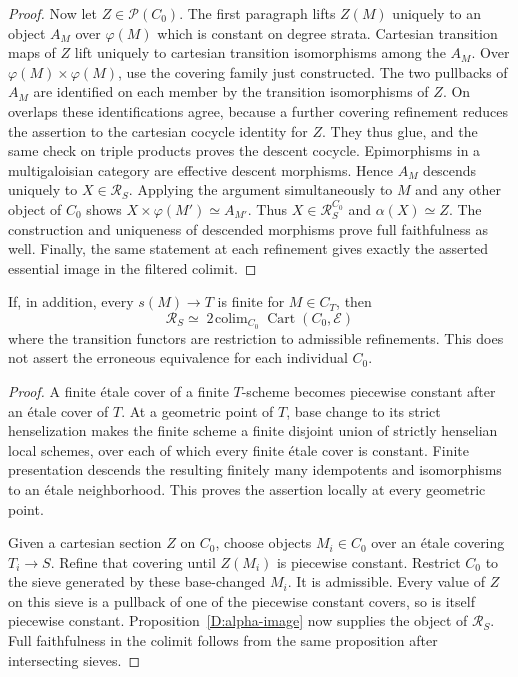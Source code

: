 \begin{proof}
Now let $Z\in\mathcal P(C_0)$. The first paragraph lifts $Z(M)$
uniquely to an object $A_M$ over $\varphi(M)$ which is constant
on degree strata. Cartesian transition maps of $Z$ lift uniquely to
cartesian transition isomorphisms among the $A_M$. Over
$\varphi(M)\times\varphi(M)$, use the covering family just
constructed. The two pullbacks of $A_M$ are identified on each
member by the transition isomorphisms of $Z$. On overlaps these
identifications agree, because a further covering refinement reduces
the assertion to the cartesian cocycle identity for $Z$. They thus
glue, and the same check on triple products proves the descent
cocycle. Epimorphisms in a multigaloisian category are effective
descent morphisms. Hence $A_M$ descends uniquely to $X\in\mathscr R_S$.
Applying the argument simultaneously to $M$ and any other object
of $C_0$ shows $X\times\varphi(M')\simeq A_{M'}$.
Thus $X\in\mathscr R_S^{C_0}$ and $\alpha(X)\simeq Z$.
The construction and uniqueness of descended morphisms prove full
faithfulness as well. Finally, the same statement at each refinement
gives exactly the asserted essential image in the filtered colimit.
\end{proof}

\begin{corollary}
\label{D:alpha-finite}
If, in addition, every $s(M)\to T$ is finite for $M\in C_T$, then
\[
 \mathscr R_S\simeq
 \mathop{\mathrm{2\!\operatorname{colim}}}_{C_0}
 \operatorname{Cart}(C_0,\mathcal E)
\]
where the transition functors are restriction to admissible refinements.
This does not assert the erroneous equivalence for each individual
$C_0$.
\end{corollary}
\begin{proof}
A finite \'etale cover of a finite $T$-scheme becomes piecewise
constant after an \'etale cover of $T$. At a geometric point of $T$,
base change to its strict henselization makes the finite scheme a
finite disjoint union of strictly henselian local schemes, over each
of which every finite \'etale cover is constant. Finite presentation
descends the resulting finitely many idempotents and isomorphisms to
an \'etale neighborhood. This proves the assertion locally at every
geometric point.

Given a cartesian section $Z$ on $C_0$, choose objects $M_i\in C_0$
over an \'etale covering $T_i\to S$. Refine that covering until
$Z(M_i)$ is piecewise constant. Restrict $C_0$ to the sieve generated
by these base-changed $M_i$. It is admissible. Every value of $Z$
on this sieve is a pullback of one of the piecewise constant covers,
so is itself piecewise constant. Proposition~\ref{D:alpha-image}
now supplies the object of $\mathscr R_S$. Full faithfulness in the
colimit follows from the same proposition after intersecting sieves.
\end{proof}

